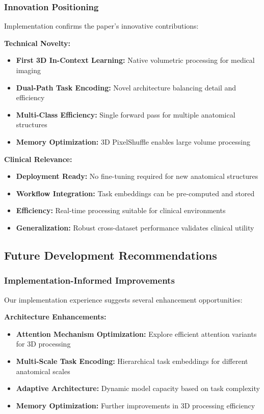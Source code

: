 \subsubsection*{Innovation Positioning}
Implementation confirms the paper's innovative contributions:

\textbf{Technical Novelty:}
\begin{itemize}
    \item \textbf{First 3D In-Context Learning:} Native volumetric processing for medical imaging
    \item \textbf{Dual-Path Task Encoding:} Novel architecture balancing detail and efficiency
    \item \textbf{Multi-Class Efficiency:} Single forward pass for multiple anatomical structures
    \item \textbf{Memory Optimization:} 3D PixelShuffle enables large volume processing
\end{itemize}

\textbf{Clinical Relevance:}
\begin{itemize}
    \item \textbf{Deployment Ready:} No fine-tuning required for new anatomical structures
    \item \textbf{Workflow Integration:} Task embeddings can be pre-computed and stored
    \item \textbf{Efficiency:} Real-time processing suitable for clinical environments
    \item \textbf{Generalization:} Robust cross-dataset performance validates clinical utility
\end{itemize}

\subsection{Future Development Recommendations}

\subsubsection*{Implementation-Informed Improvements}
Our implementation experience suggests several enhancement opportunities:

\textbf{Architecture Enhancements:}
\begin{itemize}
    \item \textbf{Attention Mechanism Optimization:} Explore efficient attention variants for 3D processing
    \item \textbf{Multi-Scale Task Encoding:} Hierarchical task embeddings for different anatomical scales
    \item \textbf{Adaptive Architecture:} Dynamic model capacity based on task complexity
    \item \textbf{Memory Optimization:} Further improvements in 3D processing efficiency
\end{itemize}

